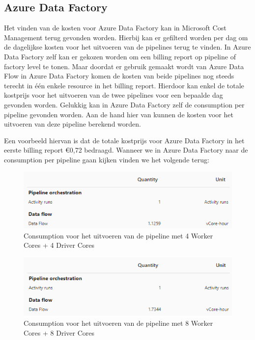 \subsection{Azure Data Factory}

Het vinden van de kosten voor Azure Data Factory kan in Microsoft Cost Management terug gevonden worden. Hierbij kan er gefilterd worden per dag om de dagelijkse kosten voor het uitvoeren van de pipelines terug te vinden. In Azure Data Factory zelf kan er gekozen worden om een billing report op pipeline of factory level te tonen. Maar doordat er gebruik gemaakt wordt van Azure Data Flow in Azure Data Factory komen de kosten van beide pipelines nog steeds terecht in één enkele resource in het billing report. Hierdoor kan enkel de totale kostprijs voor het uitvoeren van de twee pipelines voor een bepaalde dag gevonden worden. Gelukkig kan in Azure Data Factory zelf de consumption per pipeline gevonden worden. Aan de hand hier van kunnen de kosten voor het uitvoeren van deze pipeline berekend worden.

Een voorbeeld hiervan is dat de totale kostprijs voor Azure Data Factory in het eerste billing report €0,72 bedraagd. Wanneer we in Azure Data Factory naar de consumption per pipeline gaan kijken vinden we het volgende terug:


\begin{figure}[H]
    \centering
    \includegraphics[width=1\textwidth]{./graphics/kosten/5_mei_consumption_small.png}
    \caption{Consumption voor het uitvoeren van de pipeline met 4 Worker Cores + 4 Driver Cores}
\end{figure}

    
\begin{figure}[H]
    \centering
    \includegraphics[width=1\textwidth]{./graphics/kosten/5_mei_consumption_medium.png}
    \caption{Consumption voor het uitvoeren van de pipeline met 8 Worker Cores + 8 Driver Cores}
\end{figure}

